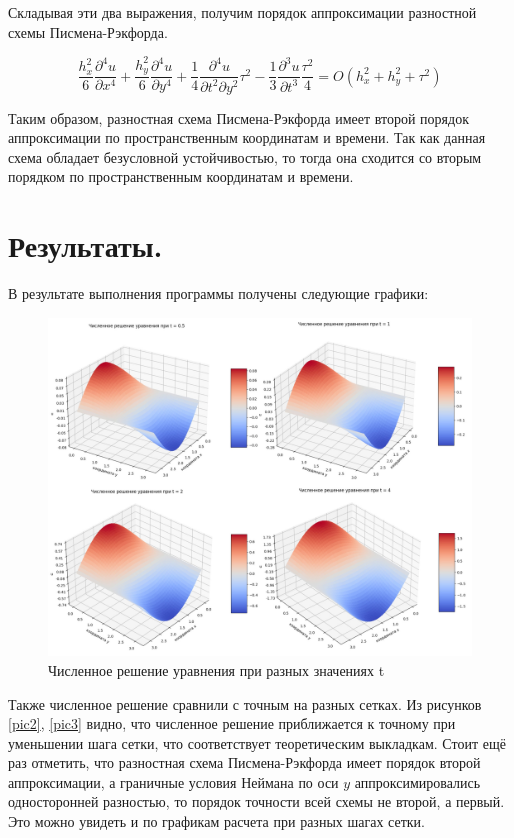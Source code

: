 \documentclass[a4paper,14pt]{article}
\begin{document}
Складывая эти два выражения, получим порядок аппроксимации разностной схемы Писмена-Рэкфорда.

$$\frac{h_x^2}{6} \frac{\partial^4 u}{\partial x^4} + \frac{h_y^2}{6} \frac{\partial^4 u}{\partial y^4}+\frac{1}{4}\frac{\partial^4 u}{\partial t^2 \partial y^2} \tau^2 - \frac{1}{3}\frac{\partial^3 u}{\partial t^3}\frac{\tau^2}{4}= O(h_x^2+h_y^2+\tau^2)$$

Таким образом, разностная схема Писмена-Рэкфорда имеет второй порядок аппроксимации по пространственным координатам и времени. Так как данная схема обладает безусловной устойчивостью, то тогда она сходится со вторым порядком по пространственным координатам и времени.

\section{Результаты.}
В результате выполнения программы получены следующие графики:

\begin{figure}[h!]
\centering
\includegraphics[scale=0.25]{решение.jpg}
\caption{\label{pic1} Численное решение уравнения при разных значениях t}
\end{figure}

Также численное решение сравнили с точным на разных сетках. Из рисунков \ref{pic2}, \ref{pic3} видно, что численное решение приближается к точному при уменьшении шага сетки, что соответствует теоретическим выкладкам. Стоит ещё раз отметить, что разностная схема Писмена-Рэкфорда имеет порядок второй аппроксимации, а граничные условия Неймана по оси $y$ аппроксимировались односторонней разностью, то порядок точности всей схемы не второй, а первый. Это можно увидеть и по графикам расчета при разных шагах сетки.
\end{document}
